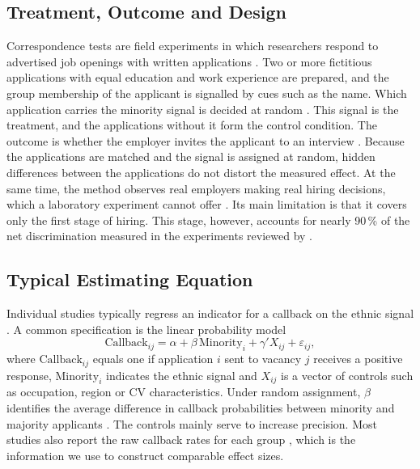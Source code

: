 \documentclass[11pt,a4paper]{article}
\begin{document}
\subsection{Treatment, Outcome and Design}

Correspondence tests are field experiments in which researchers respond to
advertised job openings with written applications \citep{riach2002}. Two or
more fictitious applications with equal education and work experience are
prepared, and the group membership of the applicant is signalled by cues
such as the name. Which application carries the minority signal is decided
at random \citep{pager2007}. This signal is the treatment, and the
applications without it form the control condition. The outcome is whether
the employer invites the applicant to an interview \citep{riach2002}.
Because the applications are matched and the signal is assigned at random,
hidden differences between the applications do not distort the measured
effect. At the same time, the method observes real employers making real
hiring decisions, which a laboratory experiment cannot offer
\citep{pager2007}. Its main limitation is that it covers only the first
stage of hiring. This stage, however, accounts for nearly 90\,\% of the net
discrimination measured in the experiments reviewed by
\citet{riach2002}.
\subsection{Typical Estimating Equation}

Individual studies typically regress an indicator for a callback on the
ethnic signal \citep[e.g.][]{bertrand2004}. A common specification is the linear probability model \citep[e.g.][]{kline2022}
\begin{equation}
  \text{Callback}_{ij} = \alpha + \beta\,\text{Minority}_i
    + \gamma' X_{ij} + \varepsilon_{ij},
\end{equation}
where $\text{Callback}_{ij}$ equals one if application $i$ sent to vacancy
$j$ receives a positive response, $\text{Minority}_i$ indicates the ethnic
signal and $X_{ij}$ is a vector of controls such as occupation, region or CV
characteristics. Under random assignment, $\beta$ identifies the average
difference in callback probabilities between minority and majority applicants \citep{pager2007}. The controls mainly serve to increase precision. Most studies
also report the raw callback rates for each group \citep{zschirnt2016},
which is the information we use to construct comparable effect sizes.
\end{document}
